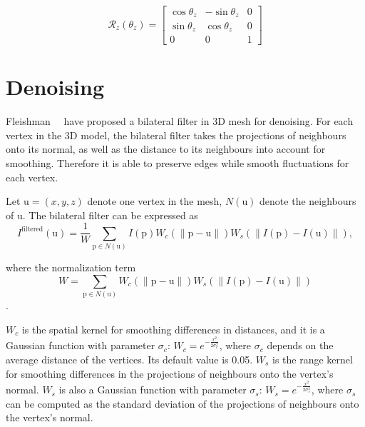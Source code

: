 \begin{equation} \label{rotationmatrix_z}
  \mathcal{R}_z(\theta_z)=
  \begin{bmatrix} 
    \cos{\theta_z} &   -\sin{\theta_z} & 0 \\
    \sin{\theta_z} & \cos{\theta_z} & 0 \\
    0 & 0 & 1 
  \end{bmatrix}
\end{equation}

\section{Denoising}

Fleishman~\etal~\cite{fleishman2003bilateral} have proposed a bilateral filter in 3D mesh for denoising. For each vertex in the 3D model, the bilateral filter takes the projections of neighbours onto its normal, as well as the distance to its neighbours into account for smoothing. Therefore it is able to preserve edges while smooth fluctuations for each vertex. 

Let $\bm{\mathrm{u}}=(x,y,z)$ denote one vertex in the mesh, $N(\bm{\mathrm{u}})$ denote the neighbours of $\bm{\mathrm{u}}$. The bilateral filter can be expressed as
\begin{equation} \label{bilaterialfilter}
I^\text{filtered}(\bm{\mathrm{u}}) = \frac{1}{W} \sum_{\bm{\mathrm{p}} \in N(\bm{\mathrm{u}})} I(\bm{\mathrm{p}})W_c(\|\bm{\mathrm{p}}-\bm{\mathrm{u}}\|)W_s(\|I(\bm{\mathrm{p}})-I(\bm{\mathrm{u}})\|),
\end{equation}

where the normalization term
\begin{equation} \label{normalizer}
W = \sum_{\bm{\mathrm{p}} \in N(\bm{\mathrm{u}})}W_c(\|\bm{\mathrm{p}}-\bm{\mathrm{u}}\|)W_s(\|I(\bm{\mathrm{p}})-I(\bm{\mathrm{u}})\|)
\end{equation}.

$W_c$ is the spatial kernel for smoothing differences in distances, and it is a Gaussian function with parameter $\sigma_c$: $W_c=e^{-\frac{x^2}{2 \sigma_c^2}}$, where $\sigma_c$ depends on the average distance of the vertices. Its default value is 0.05. $W_s$ is the range kernel for smoothing differences in the projections of neighbours onto the vertex's normal. $W_s$ is also a Gaussian function with parameter $\sigma_s$: $W_s=e^{-\frac{x^2}{2 \sigma_s^2}}$, where $\sigma_s$ can be computed as the standard deviation of the projections of neighbours onto the vertex's normal. 

